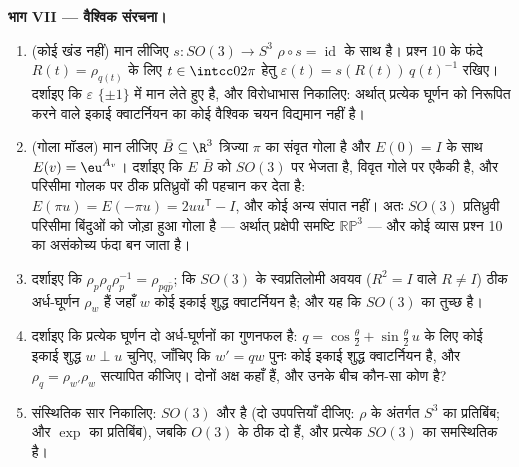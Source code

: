 \begin{problem}
\medskip
\noindent\textbf{भाग VII --- वैश्विक संरचना।}
\begin{enumerate}[resume]
  \item (कोई  खंड नहीं) मान लीजिए $s \colon SO(3) \to
        S^3$ $\rho \circ s =
        \operatorname{id}$ के साथ  है।
        प्रश्न 10 के फंदे $R(t) =
        \rho_{q(t)}$ के लिए $t \in \intcc0{2\pi}$ हेतु $\varepsilon(t) =
        s(R(t))\,q(t)^{-1}$ रखिए।
        दर्शाइए कि $\varepsilon$ $\{\pm1\}$ में मान लेते हुए  है, और
        विरोधाभास निकालिए: अर्थात् प्रत्येक घूर्णन को निरूपित
        करने वाले इकाई क्वाटर्नियन का कोई  वैश्विक चयन विद्यमान
        नहीं है।
  \item (गोला मॉडल) मान लीजिए $\bar B \subseteq \R^3$ त्रिज्या $\pi$ का संवृत गोला
        है और $E(0) = I$ के साथ $E(v) = \eu^{A_v}$। दर्शाइए कि $E$ $\bar B$ को $SO(3)$
        पर भेजता है, विवृत गोले पर एकैकी है, और परिसीमा गोलक पर
        ठीक प्रतिध्रुवों की पहचान कर देता है: $E(\pi u) = E(-\pi u) = 2uu^{\mathsf T} - I$, और कोई अन्य
        संपात नहीं। अतः $SO(3)$ प्रतिध्रुवी परिसीमा बिंदुओं को
        जोड़ा हुआ गोला है --- अर्थात् प्रक्षेपी समष्टि $\mathbb{RP}^3$ ---
        और कोई व्यास प्रश्न 10 का असंकोच्य फंदा बन जाता है।
  \item दर्शाइए कि $\rho_p\rho_q\rho_p^{-1} = \rho_{pq\bar
        p}$; कि $SO(3)$ के स्वप्रतिलोमी अवयव ($R^2 = I$
        वाले $R \neq
        I$) ठीक अर्ध-घूर्णन $\rho_w$ हैं जहाँ $w$ कोई इकाई
        शुद्ध क्वाटर्नियन है; और यह कि $SO(3)$ का  तुच्छ है।
  \item दर्शाइए कि प्रत्येक घूर्णन दो अर्ध-घूर्णनों का गुणनफल है:
        $q = \cos\frac\theta2 +
        \sin\frac\theta2\,u$ के लिए कोई इकाई शुद्ध $w \perp
        u$ चुनिए, जाँचिए कि $w' = qw$
        पुनः कोई इकाई शुद्ध क्वाटर्नियन है, और $\rho_q =
        \rho_{w'}\rho_w$ सत्यापित
        कीजिए। दोनों अक्ष कहाँ हैं, और उनके बीच कौन-सा कोण है?
  \item संस्थितिक सार निकालिए: $SO(3)$  और  है (दो
        उपपत्तियाँ दीजिए: $\rho$ के अंतर्गत $S^3$ का 
        प्रतिबिंब; और $\exp$ का प्रतिबिंब), जबकि $O(3)$ के ठीक दो
         हैं, और प्रत्येक $SO(3)$ का समस्थितिक है।


\end{enumerate}
\end{problem}

